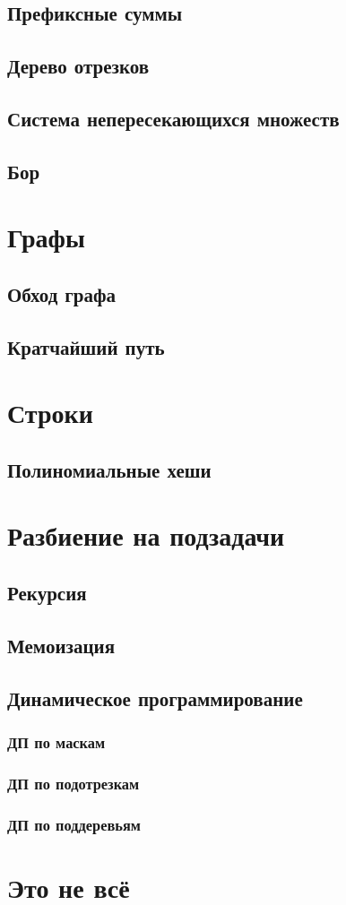 \documentclass[a4paper,8pt]{article}
\begin{document}
    \subsection{Префиксные суммы}
    \subsection{Дерево отрезков}
    \subsection{Система непересекающихся множеств}
    \subsection{Бор}
\section{Графы}
    \subsection{Обход графа}
    \subsection{Кратчайший путь}
\section{Строки}
    \subsection{Полиномиальные хеши}
\section{Разбиение на подзадачи}
    \subsection{Рекурсия}
    \subsection{Мемоизация}
    \subsection{Динамическое программирование}
        \subsubsection{ДП по маскам}
        \subsubsection{ДП по подотрезкам}
        \subsubsection{ДП по поддеревьям}
\section{Это не всё}
\end{document}

